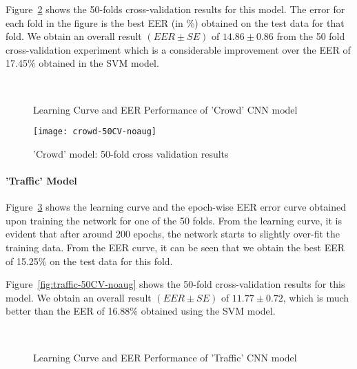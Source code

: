 Figure~\ref{fig:crowd-50CV-noaug} shows the 50-folds cross-validation results for this model. The error for each fold in the figure is the best EER (in \%) obtained on the test data for that fold. We obtain an overall result $(EER \pm SE)$ of $14.86 \pm 0.86$ from the 50 fold cross-validation experiment which is a considerable improvement over the EER of 17.45\% obtained in the SVM model.

\begin{figure}[tb]
\centering
{} \quad
{} \\
\caption[Learning Curve and EER Performance of 'Crowd' CNN model]{Learning Curve and EER Performance of 'Crowd' CNN model}
\label{fig:crowd_1d_cnn_results}
\end{figure}

\begin{figure}[!hb] 
\centering 
\texttt{[image: crowd-50CV-noaug]} 
\caption['Crowd' model: 50-fold cross validation results]{'Crowd' model: 50-fold cross validation results}
\label{fig:crowd-50CV-noaug} 
\end{figure}

\paragraph{'Traffic' Model}
Figure~\ref{fig:traffic_1d_cnn_results} shows the learning curve and the epoch-wise EER error curve obtained upon training the network for one of the 50 folds. From the learning curve, it is evident that after around 200 epochs, the network starts to slightly over-fit the training data. From the EER curve, it can be seen that we obtain the best EER of 15.25\% on the test data for this fold.

Figure~\ref{fig:traffic-50CV-noaug} shows the 50-fold cross-validation results for this model. We obtain an overall result $(EER \pm SE)$ of $11.77 \pm 0.72$, which is much better than the EER of 16.88\% obtained using the SVM model.

\begin{figure}[!hb]
\centering
{} \quad
{} \\
\caption[Learning Curve and EER Performance of 'Traffic' CNN model]{Learning Curve and EER Performance of 'Traffic' CNN model}
\label{fig:traffic_1d_cnn_results}
\end{figure}

